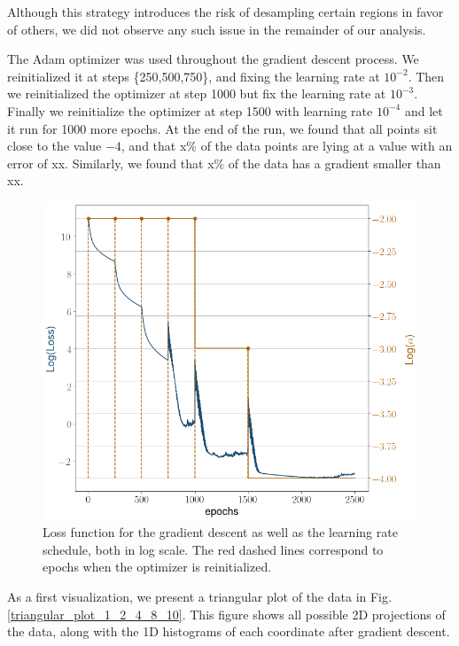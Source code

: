 \documentclass[11pt]{article}
\begin{document}
		Although this strategy introduces the risk of desampling certain regions in favor of others, we did not observe any such issue in the remainder of our analysis.
		
		The Adam optimizer was used throughout the gradient descent process. We reinitialized it at steps \{250,500,750\}, and fixing the learning rate at $10^{-2}$. Then we reinitialized the optimizer at step 1000 but fix the learning rate at $10^{-3}$. Finally we reinitialize the optimizer at step 1500 with learning rate $10^{-4}$ and let it run for 1000 more epochs. At the end of the run, we found that all points sit close to the value $-4$, and that x\% of the data points are lying at a value with an error of xx. Similarly, we found that x\% of the data has a gradient smaller than xx.

		\begin{figure}
			\centering
			\includegraphics[scale = 0.5]{Figures/Loss_grad_des.png}
			\caption{Loss function for the gradient descent as well as the learning rate schedule, both in log scale. The red dashed lines correspond to epochs when the optimizer is reinitialized.}
			\label{fig:loss_grad_des}
		\end{figure}
		
		
		As a first visualization, we present a triangular plot of the data in Fig. \ref{triangular_plot_1_2_4_8_10}. This figure shows all possible 2D projections of the data, along with the 1D histograms of each coordinate after gradient descent.
		
\end{document}
